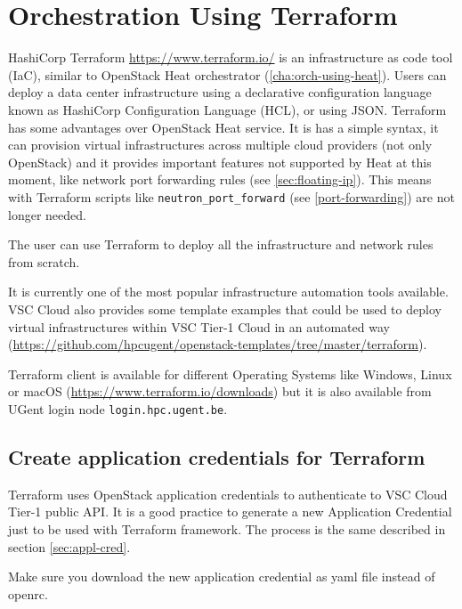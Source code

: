 \chapter{Orchestration Using Terraform}\label{cha:orch-using-terraform}

HashiCorp \gls{Terraform} \url{https://www.terraform.io/} is an infrastructure
as code tool (IaC), similar to OpenStack \gls{Heat} orchestrator (\ref{cha:orch-using-heat}).
Users can deploy a data center infrastructure using a declarative
configuration language known as HashiCorp Configuration Language (HCL), or using JSON.
\gls{Terraform} has some advantages over OpenStack \gls{Heat} service.
It is has a simple syntax, it can provision virtual infrastructures across multiple cloud
providers (not only OpenStack) and it provides important features not supported
by \gls{Heat} at this moment, like network port forwarding rules (see \ref{sec:floating-ip}).
This means with Terraform scripts like \lstinline{neutron_port_forward}
(see \ref{port-forwarding}) are not longer needed.

The user can use \gls{Terraform} to deploy all the infrastructure and network rules from scratch.

It is currently one of the most popular infrastructure automation tools available.
VSC Cloud also provides some template examples that could be used to deploy virtual
infrastructures within VSC Tier-1 Cloud in an automated way
(\url{https://github.com/hpcugent/openstack-templates/tree/master/terraform}).

\gls{Terraform} client is available for different Operating Systems like Windows,
Linux or macOS (\url{https://www.terraform.io/downloads}) but it is also available from
UGent login node \lstinline{login.hpc.ugent.be}.

\section{Create application credentials for Terraform}\label{sec:app-cred-terraform}

\gls{Terraform} uses OpenStack application credentials to authenticate
to VSC Cloud Tier-1 public API. It is a good practice to generate a new Application Credential
just to be used with \gls{Terraform} framework. The process is the same described in section \ref{sec:appl-cred}.

 Make sure you download the new application credential as yaml file instead of openrc.

